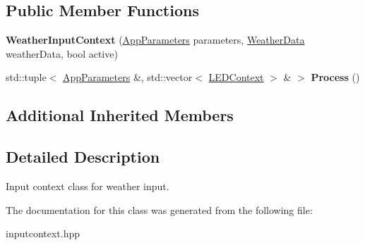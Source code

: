 \subsection*{Public Member Functions}
\begin{DoxyCompactItemize}
\item 
\mbox{\label{classWeatherInputContext_aed3db9e07794a5a475137b36d1356209}} 
{\bfseries Weather\+Input\+Context} (\hyperlink{structAppParameters}{App\+Parameters} parameters, \hyperlink{structWeatherData}{Weather\+Data} weather\+Data, bool active)
\item 
\mbox{\label{classWeatherInputContext_ad25230f426a5f5cacb527aea75e6ccc6}} 
std\+::tuple$<$ \hyperlink{structAppParameters}{App\+Parameters} \&, std\+::vector$<$ \hyperlink{classLEDContext}{L\+E\+D\+Context} $>$ \& $>$ {\bfseries Process} ()
\end{DoxyCompactItemize}
\subsection*{Additional Inherited Members}


\subsection{Detailed Description}
Input context class for weather input. 

The documentation for this class was generated from the following file\+:\begin{DoxyCompactItemize}
\item 
inputcontext.\+hpp\end{DoxyCompactItemize}
